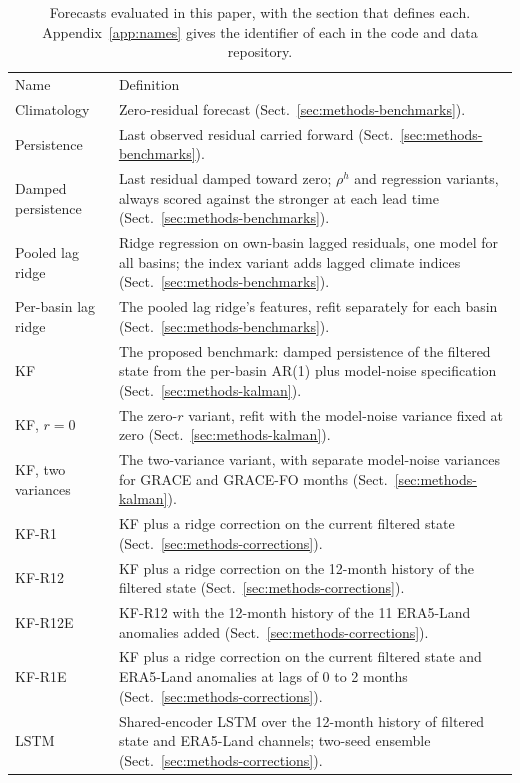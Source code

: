 \documentclass[hess, manuscript]{copernicus}
\begin{document}
\begin{table}[!htbp]
\caption{Forecasts evaluated in this paper, with the section that defines
each. Appendix~\ref{app:names} gives the identifier of each in the code
and data repository.}
\label{tab:names}
\begin{tabular}{>{\raggedright\arraybackslash}p{3.6cm}>{\raggedright\arraybackslash}p{11.6cm}}
\tophline
Name & Definition \\
\middlehline
Climatology & Zero-residual forecast (Sect.~\ref{sec:methods-benchmarks}). \\
Persistence & Last observed residual carried forward (Sect.~\ref{sec:methods-benchmarks}). \\
Damped persistence & Last residual damped toward zero; $\rho^{h}$ and regression variants, always scored against the stronger at each lead time (Sect.~\ref{sec:methods-benchmarks}). \\
Pooled lag ridge & Ridge regression on own-basin lagged residuals, one model for all basins; the index variant adds lagged climate indices (Sect.~\ref{sec:methods-benchmarks}). \\
Per-basin lag ridge & The pooled lag ridge's features, refit separately for each basin (Sect.~\ref{sec:methods-benchmarks}). \\
KF & The proposed benchmark: damped persistence of the filtered state from the per-basin AR(1) plus model-noise specification (Sect.~\ref{sec:methods-kalman}). \\
KF, $r = 0$ & The zero-$r$ variant, refit with the model-noise variance fixed at zero (Sect.~\ref{sec:methods-kalman}). \\
KF, two variances & The two-variance variant, with separate model-noise variances for GRACE and GRACE-FO months (Sect.~\ref{sec:methods-kalman}). \\
KF-R1 & KF plus a ridge correction on the current filtered state (Sect.~\ref{sec:methods-corrections}). \\
KF-R12 & KF plus a ridge correction on the 12-month history of the filtered state (Sect.~\ref{sec:methods-corrections}). \\
KF-R12E & KF-R12 with the 12-month history of the 11 ERA5-Land anomalies added (Sect.~\ref{sec:methods-corrections}). \\
KF-R1E & KF plus a ridge correction on the current filtered state and ERA5-Land anomalies at lags of 0 to 2 months (Sect.~\ref{sec:methods-corrections}). \\
LSTM & Shared-encoder LSTM over the 12-month history of filtered state and ERA5-Land channels; two-seed ensemble (Sect.~\ref{sec:methods-corrections}). \\

\end{tabular}
\end{table}
\end{document}
